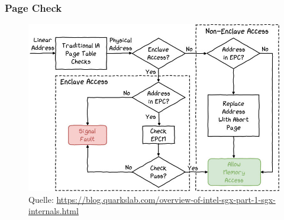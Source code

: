 \begin{frame}
    \frametitle{Page Check}
    \centering
    \begin{figure}
        \includegraphics[scale=0.35]{Images/epc_pageCheck.png}
        \caption{Quelle: \url{https://blog.quarkslab.com/overview-of-intel-sgx-part-1-sgx-internals.html}}
    \end{figure}
\end{frame}

